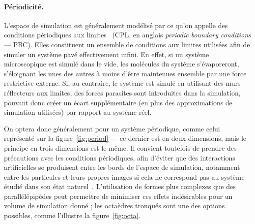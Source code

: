 	\paragraph{Périodicité.}
	L'espace de simulation est généralement modélisé par ce qu'on appelle des conditions périodiques aux limites~\cite{cheatham1995molecular} (CPL, en anglais \emph{periodic boundary conditions} --- PBC). Elles constituent un ensemble de conditions aux limites utilisées afin de simuler un système pavé effectivement infini. En effet, si un système microscopique est simulé dans le vide, les molécules du système s'évaporeront, s'éloignant les unes des autres à moins d'être maintenues ensemble par une force restrictive externe. Si, au contraire, le système est simulé en utilisant des murs réflecteurs aux limites, des forces parasites sont introduites dans la simulation, pouvant donc créer un écart supplémentaire (en plus des approximations de simulation utilisées) par rapport au système réel.
	
	On optera donc généralement pour un système périodique, comme celui représenté sur la figure~\ref{fig:period} --- ce dernier est en deux dimensions, mais le principe en trois dimensions est le même. Il convient toutefois de prendre des précautions avec les conditions périodiques, afin d'éviter que des interactions \og artificielles \fg{} se produisent entre les \og bords \fg{} de l'espace de simulation, notamment entre les particules et leurs propres images si cela ne correspond pas au système étudié dans son état naturel~\cite{de1997effect}. L'utilisation de formes plus complexes que des parallélépipèdes peut permettre de minimiser ces effets indésirables pour un volume de simulation donné ; les octaèdres tronqués sont une des options possibles, comme l'illustre la figure~\ref{fig:octa}.
	
